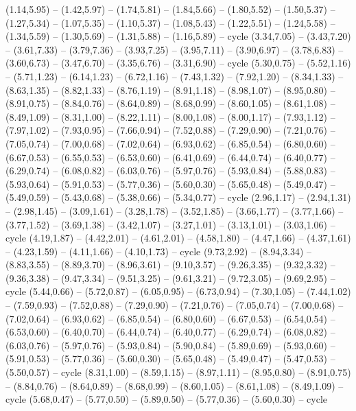{  (1.14,5.95) -- (1.42,5.97) -- (1.74,5.81) -- (1.84,5.66) -- (1.80,5.52) -- (1.50,5.37) -- (1.27,5.34) -- (1.07,5.35) -- (1.10,5.37) -- (1.08,5.43) -- (1.22,5.51) -- (1.24,5.58) -- (1.34,5.59) -- (1.30,5.69) -- (1.31,5.88) -- (1.16,5.89) -- cycle
  (3.34,7.05) -- (3.43,7.20) -- (3.61,7.33) -- (3.79,7.36) -- (3.93,7.25) -- (3.95,7.11) -- (3.90,6.97) -- (3.78,6.83) -- (3.60,6.73) -- (3.47,6.70) -- (3.35,6.76) -- (3.31,6.90) -- cycle}
\expandafter\def\csname geo:Hoehe:750\endcsname{
  (5.30,0.75) -- (5.52,1.16) -- (5.71,1.23) -- (6.14,1.23) -- (6.72,1.16) -- (7.43,1.32) -- (7.92,1.20) -- (8.34,1.33) -- (8.63,1.35) -- (8.82,1.33) -- (8.76,1.19) -- (8.91,1.18) -- (8.98,1.07) -- (8.95,0.80) -- (8.91,0.75) -- (8.84,0.76) -- (8.64,0.89) -- (8.68,0.99) -- (8.60,1.05) -- (8.61,1.08) -- (8.49,1.09) -- (8.31,1.00) -- (8.22,1.11) -- (8.00,1.08) -- (8.00,1.17) -- (7.93,1.12) -- (7.97,1.02) -- (7.93,0.95) -- (7.66,0.94) -- (7.52,0.88) -- (7.29,0.90) -- (7.21,0.76) -- (7.05,0.74) -- (7.00,0.68) -- (7.02,0.64) -- (6.93,0.62) -- (6.85,0.54) -- (6.80,0.60) -- (6.67,0.53) -- (6.55,0.53) -- (6.53,0.60) -- (6.41,0.69) -- (6.44,0.74) -- (6.40,0.77) -- (6.29,0.74) -- (6.08,0.82) -- (6.03,0.76) -- (5.97,0.76) -- (5.93,0.84) -- (5.88,0.83) -- (5.93,0.64) -- (5.91,0.53) -- (5.77,0.36) -- (5.60,0.30) -- (5.65,0.48) -- (5.49,0.47) -- (5.49,0.59) -- (5.43,0.68) -- (5.38,0.66) -- (5.34,0.77) -- cycle
  (2.96,1.17) -- (2.94,1.31) -- (2.98,1.45) -- (3.09,1.61) -- (3.28,1.78) -- (3.52,1.85) -- (3.66,1.77) -- (3.77,1.66) -- (3.77,1.52) -- (3.69,1.38) -- (3.42,1.07) -- (3.27,1.01) -- (3.13,1.01) -- (3.03,1.06) -- cycle
  (4.19,1.87) -- (4.42,2.01) -- (4.61,2.01) -- (4.58,1.80) -- (4.47,1.66) -- (4.37,1.61) -- (4.23,1.59) -- (4.11,1.66) -- (4.10,1.73) -- cycle
  (9.73,2.92) -- (8.94,3.34) -- (8.83,3.55) -- (8.89,3.70) -- (8.96,3.61) -- (9.10,3.57) -- (9.26,3.35) -- (9.32,3.32) -- (9.36,3.38) -- (9.47,3.34) -- (9.51,3.25) -- (9.61,3.21) -- (9.72,3.05) -- (9.69,2.95) -- cycle}
\expandafter\def\csname geo:Hoehe:1000\endcsname{
  (5.44,0.66) -- (5.72,0.87) -- (6.05,0.95) -- (6.73,0.94) -- (7.30,1.05) -- (7.44,1.02) -- (7.59,0.93) -- (7.52,0.88) -- (7.29,0.90) -- (7.21,0.76) -- (7.05,0.74) -- (7.00,0.68) -- (7.02,0.64) -- (6.93,0.62) -- (6.85,0.54) -- (6.80,0.60) -- (6.67,0.53) -- (6.54,0.54) -- (6.53,0.60) -- (6.40,0.70) -- (6.44,0.74) -- (6.40,0.77) -- (6.29,0.74) -- (6.08,0.82) -- (6.03,0.76) -- (5.97,0.76) -- (5.93,0.84) -- (5.90,0.84) -- (5.89,0.69) -- (5.93,0.60) -- (5.91,0.53) -- (5.77,0.36) -- (5.60,0.30) -- (5.65,0.48) -- (5.49,0.47) -- (5.47,0.53) -- (5.50,0.57) -- cycle
  (8.31,1.00) -- (8.59,1.15) -- (8.97,1.11) -- (8.95,0.80) -- (8.91,0.75) -- (8.84,0.76) -- (8.64,0.89) -- (8.68,0.99) -- (8.60,1.05) -- (8.61,1.08) -- (8.49,1.09) -- cycle}
\expandafter\def\csname geo:Hoehe:1500\endcsname{
  (5.68,0.47) -- (5.77,0.50) -- (5.89,0.50) -- (5.77,0.36) -- (5.60,0.30) -- cycle}

